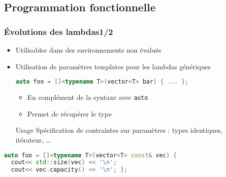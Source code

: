 \documentclass[C++.tex]{subfiles}
\begin{document}
\subsection*{Programmation fonctionnelle}
\begin{frame}[fragile]
	\frametitle{Évolutions des lambdas\titlehfill{}1/2}
	\begin{itemize}
		\item Utilisables dans des environnements non évalués
		\item Utilisation de paramètres templates pour les lambdas génériques

		\begin{lstlisting}[language=C++]
auto foo = []<typename T>(vector<T> bar) { ... };\end{lstlisting}

		\begin{itemize}
			\item En complément de la syntaxe avec \lstinline|auto|


			\item Permet de récupérer le type

		\end{itemize}

		\begin{block}{Usage}
			Spécification de contraintes sur paramètres : types identiques, itérateur, \ldots
		\end{block}
	\end{itemize}

	\begin{lstlisting}[language=C++]
auto foo = []<typename T>(vector<T> const& vec) { 
  cout<< std::size(vec) << '\n';
  cout<< vec.capacity() << '\n'; };\end{lstlisting}

\end{frame}
\end{document}
